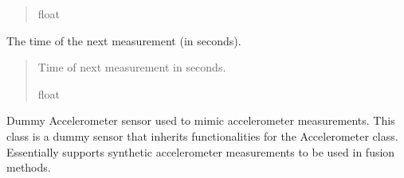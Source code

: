 \documentclass[letterpaper,10pt,english]{sphinxmanual}
\begin{document}
\begin{fulllineitems}
\begin{fulllineitems}
\begin{quote}
\begin{description}
\sphinxAtStartPar
float

\end{description}\end{quote}

\end{fulllineitems}


\begin{fulllineitems}
\label{\detokenize{modules/quantum/dummy:qnav.quantum.dummy.DummySensor.next_update}}
\pysigstartsignatures
{}
\pysigstopsignatures
\sphinxAtStartPar
The time of the next measurement (in seconds).
\begin{quote}\begin{description}
\sphinxAtStartPar
Time of next measurement in seconds.

\sphinxAtStartPar
float

\end{description}\end{quote}

\end{fulllineitems}


\end{fulllineitems}


\begin{fulllineitems}
\label{\detokenize{modules/quantum/dummy:qnav.quantum.dummy.DummyAccelerometer}}
\pysigstartsignatures
{}
\pysigstopsignatures
\sphinxAtStartPar
Dummy Accelerometer sensor used to mimic accelerometer measurements.
This class is a dummy sensor that inherits functionalities for the
Accelerometer class. Essentially supports synthetic accelerometer
measurements to be used in fusion methods.

\end{fulllineitems}
\end{document}
